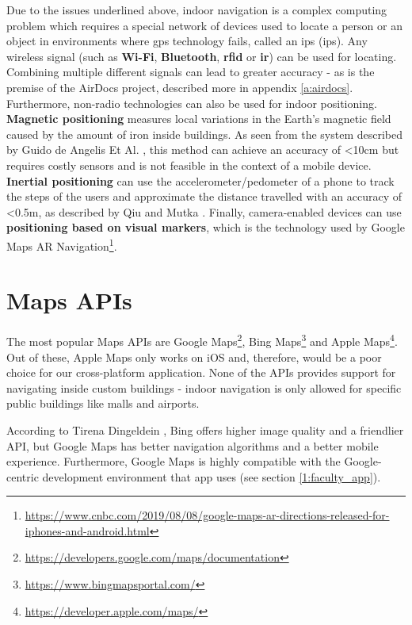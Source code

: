     Due to the issues underlined above, indoor navigation is a complex computing problem which requires a special network of devices used to locate a person or an object in environments where \gls{gps} technology fails, called an \acrlong{ips} (\acrshort{ips}). Any wireless signal (such as \textbf{Wi-Fi}, \textbf{Bluetooth}, \textbf{\acrshort{rfid}} or \textbf{\acrshort{ir}}) can be used for locating. Combining multiple different signals can lead to greater accuracy - as is the premise of the AirDocs project, described more in appendix \ref{a:airdocs}. 
    Furthermore, non-radio technologies can also be used for indoor positioning. \textbf{Magnetic positioning} measures local variations in the Earth's magnetic field caused by the amount of iron inside buildings. As seen from the system described by Guido de Angelis Et Al. \cite{de2014indoor}, this method can achieve an accuracy of <10cm but requires costly sensors and is not feasible in the context of a mobile device. \textbf{Inertial positioning} can use the accelerometer/pedometer of a phone to track the steps of the users and approximate the distance travelled with an accuracy of <0.5m, as described by Qiu and Mutka \cite{qiu2017self}. Finally, camera-enabled devices can use \textbf{positioning based on visual markers}, which is the technology used by Google Maps AR Navigation\footnote{\url{https://www.cnbc.com/2019/08/08/google-maps-ar-directions-released-for-iphones-and-android.html}}.


\section{Maps APIs} \label{2:maps_apis}

    The most popular Maps APIs are Google Maps\footnote{\url{https://developers.google.com/maps/documentation}}, Bing Maps\footnote{\url{https://www.bingmapsportal.com/}} and Apple Maps\footnote{\url{https://developer.apple.com/maps/}}. Out of these, Apple Maps only works on iOS and, therefore, would be a poor choice for our cross-platform application. None of the APIs provides support for navigating inside custom buildings - indoor navigation is only allowed for specific public buildings like malls and airports.
    
    According to Tirena Dingeldein \cite{dingeldein2019bingvsgoogle}, Bing offers higher image quality and a friendlier API, but Google Maps has better navigation algorithms and a better mobile experience. Furthermore, Google Maps is highly compatible with the Google-centric development environment that \gls{app} uses (see section \ref{1:faculty_app}).
    
